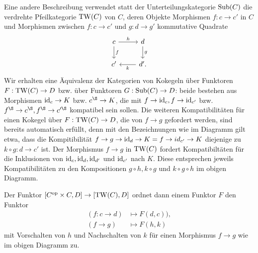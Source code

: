 \begin{bem}
  Eine andere Beschreibung verwendet statt der Unterteilungskategorie
  $\operatorname{Sub}(C)$ die verdrehte Pfeilkategorie $\operatorname{TW}(C)$ von $C$, deren
  Objekte Morphismen $f: c \to c'$ in $C$ und Morphismen zwischen $f:
  c \to c'$ und $g: d \to g'$ kommutative Quadrate
  \[ \begin{tikzcd}
    c \arrow{d}{f} \arrow{r}{h} & d \arrow{d}{g} \\
    c' & \arrow{l}{k} d'.
  \end{tikzcd} \]
  Wir erhalten eine Äquivalenz der Kategorien von Kokegeln über
  Funktoren $F: \operatorname{TW}(C) \to D$ bzw. über Funktoren $G: \operatorname{Sub}(C) \to D$:
  beide bestehen aus Morphismen $\operatorname{id}_c \to K$ bzw. $c^\S \to K$, die
  mit $f \to \operatorname{id}_c, f \to \operatorname{id}_{c'}$ bzw. $f^\S \to c^\S, f^\S \to
  c'^\S$ kompatibel sein sollen. Die weiteren Kompatibilitäten für
  einen Kokegel über $F: \operatorname{TW}(C) \to D$, die von $f \to g$ gefordert
  werden, sind bereits automatisch erfüllt, denn mit den Bezeichnungen
  wie im Diagramm gilt etwa, dass die Kompitibilität $f \to g \to
  \operatorname{id}_d \to K = f \to id_{c'} \to K$ diejenige zu $k \circ g: d \to
  c'$ ist. Der Morphismus $f \to g$ in $\operatorname{TW}(C)$ fordert
  Kompatibiltäten für die Inklusionen von $\operatorname{id}_c, \operatorname{id}_d, \operatorname{id}_{d'}$ und
  $\operatorname{id}_{c'}$ nach $K$. Diese entsprechen jeweils Kompatibilitäten zu
  den Kompositionen $g \circ h, k \circ g$ und $k \circ g \circ h$ im
  obigen Diagramm.

  Der Funktor $[C^\mathrm{op} \times C, D] \to [\operatorname{TW}(C), D]$ ordnet dann einem
  Funktor $F$ den Funktor
  \begin{align*}
    (f: c \to d) &\mapsto F(d, c)), \\
    (f \to g) &\mapsto F(h, k)
  \end{align*}
  mit Vorschalten von $h$ und Nachschalten von $k$ für einen
  Morphismus $f \to g$ wie im obigen Diagramm zu.
\end{bem}

